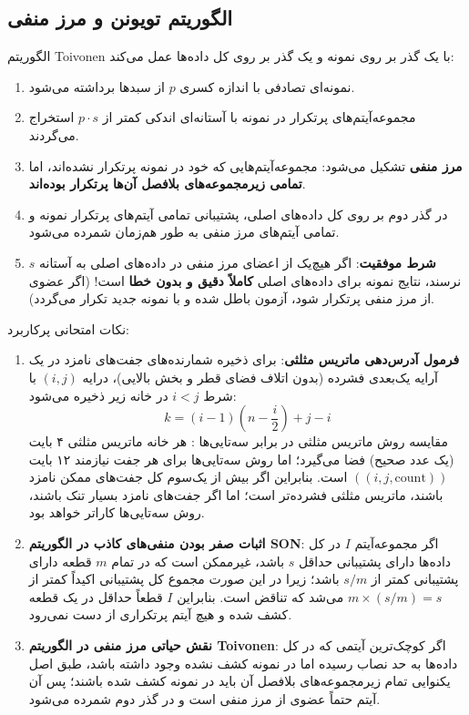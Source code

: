 \subsection{الگوریتم تویونن \texorpdfstring{}{(Toivonen's Algorithm)} و مرز منفی}
الگوریتم Toivonen با یک گذر بر روی نمونه و یک گذر بر روی کل داده‌ها عمل می‌کند:
\begin{enumerate}
    \item نمونه‌ای تصادفی با اندازه کسری $p$ از سبدها برداشته می‌شود.
    \item مجموعه‌آیتم‌های پرتکرار در نمونه با آستانه‌ای اندکی کمتر از $p \cdot s$ استخراج می‌گردند.
    \item \textbf{مرز منفی } تشکیل می‌شود: مجموعه‌آیتم‌هایی که خود در نمونه پرتکرار نشده‌اند، اما \textbf{تمامی زیرمجموعه‌های بلافصل آن‌ها پرتکرار بوده‌اند}.
    \item در گذر دوم بر روی کل داده‌های اصلی، پشتیبانی تمامی آیتم‌های پرتکرار نمونه و تمامی آیتم‌های مرز منفی به طور هم‌زمان شمرده می‌شود.
    \item \textbf{شرط موفقیت}: اگر هیچ‌یک از اعضای مرز منفی در داده‌های اصلی به آستانه $s$ نرسند، نتایج نمونه برای داده‌های اصلی \textbf{کاملاً دقیق و بدون خطا} است! (اگر عضوی از مرز منفی پرتکرار شود، آزمون باطل شده و با نمونه جدید تکرار می‌گردد).
\end{enumerate}

\begin{examnote}
نکات امتحانی پرکاربرد:
\begin{enumerate}
    \item \textbf{فرمول آدرس‌دهی ماتریس مثلثی}: برای ذخیره شمارنده‌های جفت‌های نامزد در یک آرایه یک‌بعدی فشرده (بدون اتلاف فضای قطر و بخش بالایی)، درایه $(i, j)$ با شرط $i < j$ در خانه زیر ذخیره می‌شود:
    \begin{equation}
    k = (i - 1) \left( n - \frac{i}{2} \right) + j - i
    \end{equation}
    مقایسه روش ماتریس مثلثی در برابر سه‌تایی‌ها : هر خانه ماتریس مثلثی ۴ بایت (یک عدد صحیح) فضا می‌گیرد؛ اما روش سه‌تایی‌ها برای هر جفت نیازمند ۱۲ بایت $((i, j, \text{count}))$ است. بنابراین اگر بیش از یک‌سوم کل جفت‌های ممکن نامزد باشند، ماتریس مثلثی فشرده‌تر است؛ اما اگر جفت‌های نامزد بسیار تنک باشند، روش سه‌تایی‌ها کاراتر خواهد بود.
    \item \textbf{اثبات صفر بودن منفی‌های کاذب در الگوریتم SON}:
    اگر مجموعه‌آیتم $I$ در کل داده‌ها دارای پشتیبانی حداقل $s$ باشد، غیرممکن است که در تمام $m$ قطعه دارای پشتیبانی کمتر از $s/m$ باشد؛ زیرا در این صورت مجموع کل پشتیبانی اکیداً کمتر از $m \times (s/m) = s$ می‌شد که تناقض است. بنابراین $I$ قطعاً حداقل در یک قطعه کشف شده و هیچ آیتم پرتکراری از دست نمی‌رود.
    \item \textbf{نقش حیاتی مرز منفی در الگوریتم Toivonen}: اگر کوچک‌ترین آیتمی که در کل داده‌ها به حد نصاب رسیده اما در نمونه کشف نشده وجود داشته باشد، طبق اصل یکنوایی تمام زیرمجموعه‌های بلافصل آن باید در نمونه کشف شده باشند؛ پس آن آیتم حتماً عضوی از مرز منفی است و در گذر دوم شمرده می‌شود.
\end{enumerate}
\end{examnote}

